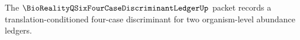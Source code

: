 The $\BioRealityQSixFourCaseDiscriminantLedgerUp$ packet records a translation-conditioned four-case discriminant for two organism-level abundance ledgers.

